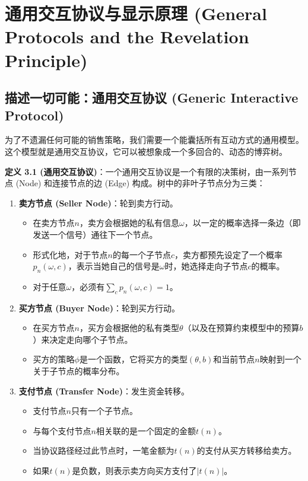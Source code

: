 \section{通用交互协议与显示原理 (General Protocols and the Revelation Principle)}

\subsection{描述一切可能：通用交互协议 (Generic Interactive Protocol)}

为了不遗漏任何可能的销售策略，我们需要一个能囊括所有互动方式的通用模型。这个模型就是通用交互协议，它可以被想象成一个多回合的、动态的博弈树。

\textbf{定义 3.1 (通用交互协议)}：一个通用交互协议是一个有限的决策树，由一系列节点 (Node) 和连接节点的边 (Edge) 构成。树中的非叶子节点分为三类：
\begin{enumerate}
    \item \textbf{卖方节点 (Seller Node)}：轮到卖方行动。
       \begin{itemize}
         \item 在卖方节点$n$，卖方会根据她的私有信息$\omega$，以一定的概率选择一条边（即发送一个信号）通往下一个节点。
         \item 形式化地，对于节点$n$的每一个子节点$c$，卖方都预先设定了一个概率$p_n(\omega, c)$，表示当她自己的信号是$\omega$时，她选择走向子节点$c$的概率。
         \item 对于任意$\omega$，必须有$\sum\limits_{c}p_n(\omega,c)=1$。
       \end{itemize}
    \item \textbf{买方节点 (Buyer Node)}：轮到买方行动。
       \begin{itemize}
         \item 在买方节点$n$，买方会根据他的私有类型$\theta$（以及在预算约束模型中的预算$b$）来决定走向哪个子节点。
         \item 买方的策略$\phi$是一个函数，它将买方的类型$(\theta,b)$和当前节点$n$映射到一个关于子节点的概率分布。
       \end{itemize}
    \item \textbf{支付节点 (Transfer Node)}：发生资金转移。
       \begin{itemize}
         \item 支付节点$n$只有一个子节点。
         \item 与每个支付节点$n$相关联的是一个固定的金额$t(n)$。
         \item 当协议路径经过此节点时，一笔金额为$t(n)$的支付从买方转移给卖方。
         \item 如果$t(n)$是负数，则表示卖方向买方支付了$|t(n)|$。
       \end{itemize}
\end{enumerate}

